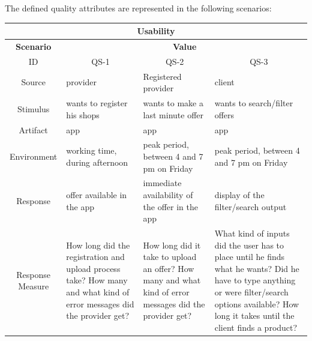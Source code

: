 \newpage
The defined quality attributes are represented in the following scenarios:

\begin{table}[H]
    \begin{tabularx}{\textwidth}{|c|X|X|X|}
        \hline
        \multicolumn{4}{c}{\textbf{Usability}} \\
        \hline
        \toprule
        \multicolumn{1}{|c|}{\textbf{Scenario}} & \multicolumn{3}{|c|}{\textbf{Value}} \\
        \midrule
        \multicolumn{1}{|c|}{ID} & \multicolumn{1}{|c|}{QS-1} & \multicolumn{1}{|c|}{QS-2} & \multicolumn{1}{|c|}{QS-3}  \\
        \hline
        Source & \Gls{provider} & Registered \Gls{provider} & \Gls{client}  \\
        \hline
        Stimulus & wants to register his shops & wants to make a last minute offer & wants to search/filter offers \\
        \hline
        Artifact & app & app & app \\
        \hline
        Environment & working time, during afternoon & peak period, between 4 and 7 pm on Friday & peak period, between 4 and 7 pm on Friday \\
        \hline
        Response & offer available in the app & immediate availability of the offer in the app & display of the filter/search output \\
        \hline
        Response Measure & How long did the registration and upload process take? How many and what kind of error messages did the \gls{provider} get?
        & How long did it take to upload an offer? How many and what kind of error messages did the \gls{provider} get? 
        & What kind of inputs did the user has to place until he finds what he wants? Did he have to type anything or were filter/search
        options available? How long it takes until the client finds a product? \\
        \bottomrule
    \end{tabularx}
\end{table}

